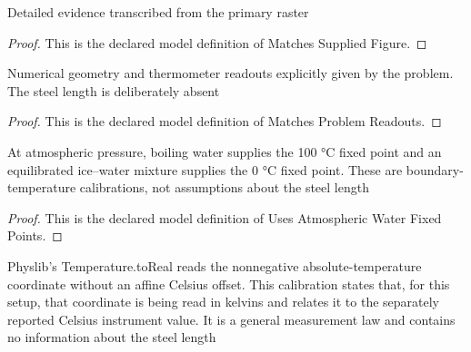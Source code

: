 \begin{definition}
  \label{def:physics:phyx-mini-0331:phyxminiproblems-problemphyxmini0331-matchessuppliedfigure}
  Detailed evidence transcribed from the primary raster
\end{definition}
\begin{proof}
  This is the declared model definition of Matches Supplied Figure.
\end{proof}
\begin{definition}
  \label{def:physics:phyx-mini-0331:phyxminiproblems-problemphyxmini0331-matchesproblemreadouts}
  Numerical geometry and thermometer readouts explicitly given by the problem. The steel length is deliberately absent
\end{definition}
\begin{proof}
  This is the declared model definition of Matches Problem Readouts.
\end{proof}
\begin{definition}
  \label{def:physics:phyx-mini-0331:phyxminiproblems-problemphyxmini0331-usesatmosphericwaterfixedpoints}
  At atmospheric pressure, boiling water supplies the 100 °C fixed point and an equilibrated ice--water mixture supplies the 0 °C fixed point. These are boundary-temperature calibrations, not assumptions about the steel length
\end{definition}
\begin{proof}
  This is the declared model definition of Uses Atmospheric Water Fixed Points.
\end{proof}
\begin{definition}
  \label{def:physics:phyx-mini-0331:phyxminiproblems-problemphyxmini0331-satisfieskelvincelsiuscalibration}
  Physlib's Temperature.toReal reads the nonnegative absolute-temperature coordinate without an affine Celsius offset. This calibration states that, for this setup, that coordinate is being read in kelvins and relates it to the separately reported Celsius instrument value. It is a general measurement law and contains no information about the steel length
\end{definition}
